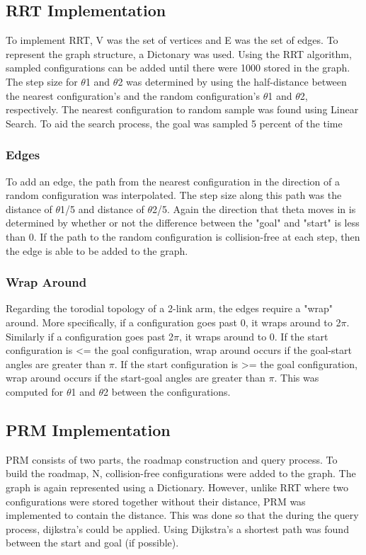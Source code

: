 \documentclass{article}
\begin{document}
\subsection{RRT Implementation}
To implement RRT, V was the set of vertices and E was the set of edges. To represent the graph structure, a Dictonary was used. Using the RRT algorithm, sampled configurations can be added until there were 1000 stored in the graph. The step size for $\theta$1 and $\theta$2 was determined by using the half-distance between the nearest configuration's and the random configuration's $\theta$1 and $\theta$2, respectively. The nearest configuration to random sample was found using Linear Search. To aid the search process, the goal was sampled 5 percent of the time
\subsubsection{Edges}
To add an edge, the path from the nearest configuration in the direction of a random configuration was interpolated. The step size along this path was the distance of $\theta$1/5 and distance of $\theta$2/5. Again the direction that theta moves in is determined by whether or not the difference between the "goal" and "start" is less than 0. If the path to the random configuration is collision-free at each step, then the edge is able to be added to the graph. 
\subsubsection{Wrap Around}
Regarding the torodial topology of a 2-link arm, the edges require a "wrap" around. More specifically, if a configuration goes past 0, it wraps around to 2$\pi$. Similarly if a configuration goes past 2$\pi$, it wraps around to 0. If the start configuration is <= the goal configuration, wrap around occurs if the goal-start angles are greater than $\pi$. If the start configuration is >= the goal configuration, wrap around occurs if the start-goal angles are greater than $\pi$. This was computed for $\theta$1 and $\theta$2 between the configurations.
\subsection{PRM Implementation}
PRM consists of two parts, the roadmap construction and query process. To build the roadmap, N, collision-free configurations were added to the graph. The graph is again represented using a Dictionary. However, unlike RRT where two configurations were stored together without their distance, PRM was implemented to contain the distance. This was done so that the during the query process, dijkstra's could be applied. Using Dijkstra's a shortest path was found between the start and goal (if possible). 
\end{document}
